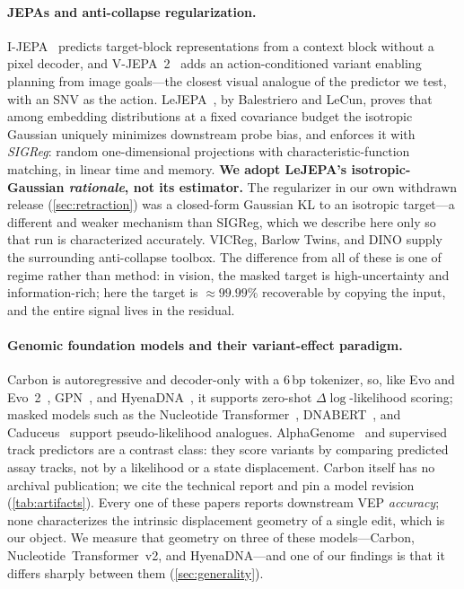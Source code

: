 \documentclass{article}
\begin{document}
\paragraph{JEPAs and anti-collapse regularization.}
I-JEPA~\citep{jepa2023} predicts target-block representations from a context block without a pixel
decoder, and V-JEPA~2~\citep{vjepa2_2025} adds an action-conditioned variant enabling planning from
image goals---the closest visual analogue of the predictor we test, with an SNV as the action.
LeJEPA~\citep{lejepa2025}, by Balestriero and LeCun, proves that among embedding distributions at a
fixed covariance budget the isotropic Gaussian uniquely minimizes downstream probe bias, and
enforces it with \emph{SIGReg}: random one-dimensional projections with characteristic-function
matching, in linear time and memory. \textbf{We adopt LeJEPA's isotropic-Gaussian \emph{rationale},
not its estimator.} The regularizer in our own withdrawn release (\cref{sec:retraction}) was a
closed-form Gaussian KL to an isotropic target---a different and weaker mechanism than SIGReg,
which we describe here only so that run is characterized accurately. VICReg, Barlow Twins, and DINO
supply the surrounding anti-collapse toolbox. The difference from all of these is one of regime
rather than method: in vision, the masked target is high-uncertainty and information-rich; here the
target is $\approx99.99\%$ recoverable by copying the input, and the entire signal lives in the
residual.

\paragraph{Genomic foundation models and their variant-effect paradigm.}
Carbon is autoregressive and decoder-only with a $6$\,bp tokenizer, so, like Evo and
Evo~2~\citep{evo2024,evo2_2025}, GPN~\citep{gpn2023}, and HyenaDNA~\citep{hyenadna2023}, it
supports zero-shot $\Delta\log$-likelihood scoring; masked models such as the Nucleotide
Transformer~\citep{nucleotidetransformer2025}, DNABERT~\citep{dnabert2021}, and
Caduceus~\citep{caduceus2024} support pseudo-likelihood analogues. AlphaGenome~\citep{alphagenome2025}
and supervised track predictors are a contrast class: they score variants by comparing predicted
assay tracks, not by a likelihood or a state displacement. Carbon itself has no archival
publication; we cite the technical report and pin a model revision (\cref{tab:artifacts}). Every
one of these papers reports downstream VEP \emph{accuracy}; none characterizes the intrinsic
displacement geometry of a single edit, which is our object. We measure that geometry on three of
these models---Carbon, Nucleotide~Transformer~v2, and HyenaDNA---and one of our findings is that it
differs sharply between them (\cref{sec:generality}).
\end{document}
